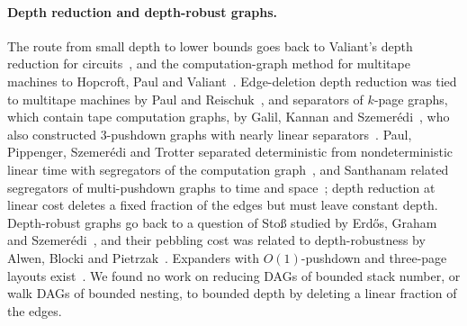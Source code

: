 \paragraph{Depth reduction and depth-robust graphs.} The route from small depth to lower bounds goes back to Valiant's depth
reduction for circuits~\cite{Valiant1977}, and the computation-graph method for multitape machines to Hopcroft, Paul and
Valiant~\cite{HPV1977}. Edge-deletion depth reduction was tied to multitape machines by Paul and
Reischuk~\cite{PaulReischuk1980}, and separators of $k$-page graphs, which contain tape computation graphs, by Galil, Kannan and
Szemerédi~\cite{GKS1989separators}, who also constructed $3$-pushdown graphs with nearly linear
separators~\cite{GKS1989pushdown}. Paul, Pippenger, Szemerédi and Trotter separated deterministic from nondeterministic linear
time with segregators of the computation graph~\cite{PPST1983}, and Santhanam related segregators of multi-pushdown graphs to
time and space~\cite{Santhanam2001}; depth reduction at linear cost deletes a fixed fraction of the edges but must leave
constant depth. Depth-robust graphs go back to a question of Stoß studied by Erdős, Graham and Szemerédi~\cite{EGS1975}, and their
pebbling cost was related to depth-robustness by Alwen, Blocki and Pietrzak~\cite{ABP2017}. Expanders with $O(1)$-pushdown and
three-page layouts exist~\cite{DvirWigderson2010,BourgainYehudayoff2013,DSW2016}. We found no work on reducing DAGs of bounded
stack number, or walk DAGs of bounded nesting, to bounded depth by deleting a linear fraction of the edges.

